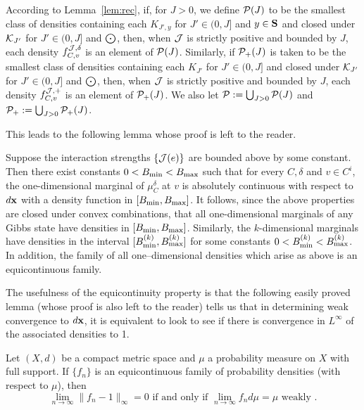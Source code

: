 According to Lemma~\ref{lem:rec}, if, for $J>0$, we define $\PP (J)$ to be 
the smallest class of densities containing each $K_{J' , y}$ for 
$J' \in (0,J]$ and $y \in \S$ and closed under $\K_{J'}$ for $J' \in (0,J]$
and $\poi$, then, when $\J$ is strictly positive and
bounded by $J$, each density $f^{\J , \p}_{C , v}$ is an element of $\PP(J)$. 
Similarly, if $\PP_+(J)$ is taken to be 
the smallest class of densities containing each $K_{J'}$ for 
$J' \in (0,J]$ and closed under $\K_{J'}$ for $J' \in (0,J]$
and $\poi$, then, when $\J$ is strictly positive and 
bounded by $J$, each density 
$f^{\J , +}_{C , v}$ is an element of $\PP_+(J)$. We also let
$\PP:=\bigcup_{J> 0}\PP(J)$ and $\PP_+:=\bigcup_{J> 0}\PP_+(J)$.

This leads to the following lemma whose proof is left to the reader.   

\begin{lem} \label{lem:unifbd} 
Suppose the interaction strengths $\{ \J (e) \}$ are bounded above
by some constant.  
Then there exist constants $0 < B_{\rm min} < B_{\rm max}$ such that 
for every $C , \delta$ and $v \in C^i$, the one-dimensional marginal
of $\mu^{\delta}_C$ at $v$ is absolutely
continuous with respect to $\dx$ with a
density function in $[B_{\rm min} , B_{\rm max}]$.
It follows, since the above properties are closed under convex combinations,
that all one-dimensional marginals of any Gibbs state have densities
in $[B_{\rm min} , B_{\rm max}]$. Similarly, the $k$-dimensional marginals have
densities in the interval $[B_{\rm min}^{(k)} , B_{\rm max}^{(k)}]$
for some constants $0< B_{\rm min}^{(k)} < B_{\rm max}^{(k)}$.
In addition, the family of all one--dimensional densities which arise as
above is an equicontinuous family.
\end{lem}

The usefulness of the equicontinuity property is that the following
easily proved lemma (whose proof is also left to the reader) tells us that
in determining weak convergence to $\dx$, it is equivalent to look to see if
there is convergence in $L^\infty$ of the associated densities to 1.
%
\begin{lem} \label{lem:converge}
Let $(X,d)$ be a compact metric space and $\mu$ a probability measure on
$X$ with full support. If $\{f_n\}$ is an equicontinuous family of
probability densities (with respect to $\mu$), then
$$
\lim_{n\to\infty} \|f_n-1\|_{\infty} = 0 \mbox{ if and only if } 
\lim_{n\to\infty} f_n d\mu = \mu \mbox{ weakly }.
$$
\end{lem}

